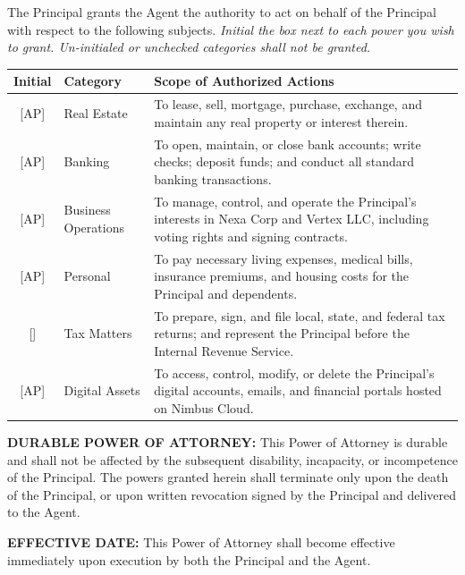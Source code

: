 \documentclass[10pt,letterpaper]{article}
\begin{document}
\begin{tcolorbox}[
    title={2. GRANT OF POWERS \& SCOPE},
    before=\noindent,
    after=\vspace{8pt}
]
\small
The Principal grants the Agent the authority to act on behalf of the Principal with respect to the following subjects. \textit{Initial the box next to each power you wish to grant. Un-initialed or unchecked categories shall not be granted.}
\vspace{6pt}

\begin{tabularx}{\textwidth}{@{} c l X @{}}
    \toprule
    \textbf{Initial} & \textbf{Category} & \textbf{Scope of Authorized Actions} \\
    \midrule{}
    [\quad AP\quad] & Real Estate & To lease, sell, mortgage, purchase, exchange, and maintain any real property or interest therein. \\
    \midrule{}
    [\quad AP\quad] & Banking & To open, maintain, or close bank accounts; write checks; deposit funds; and conduct all standard banking transactions. \\
    \midrule{}
    [\quad AP\quad] & Business Operations & To manage, control, and operate the Principal's interests in Nexa Corp and Vertex LLC, including voting rights and signing contracts. \\
    \midrule{}
    [\quad AP\quad] & Personal & To pay necessary living expenses, medical bills, insurance premiums, and housing costs for the Principal and dependents. \\
    \midrule{}
    [\quad \phantom{AP}\quad] & Tax Matters & To prepare, sign, and file local, state, and federal tax returns; and represent the Principal before the Internal Revenue Service. \\
    \midrule{}
    [\quad AP\quad] & Digital Assets & To access, control, modify, or delete the Principal's digital accounts, emails, and financial portals hosted on Nimbus Cloud. \\
    \bottomrule
\end{tabularx}
\end{tcolorbox}

\newpage

\begin{tcolorbox}[
    title={3. DURABILITY \& EFFECTIVE DATE},
    before=\noindent,
    after=\vspace{8pt}
]
\textbf{DURABLE POWER OF ATTORNEY:} This Power of Attorney is durable and shall not be affected by the subsequent disability, incapacity, or incompetence of the Principal. The powers granted herein shall terminate only upon the death of the Principal, or upon written revocation signed by the Principal and delivered to the Agent.
\vspace{6pt}

\textbf{EFFECTIVE DATE:} This Power of Attorney shall become effective immediately upon execution by both the Principal and the Agent.
\end{tcolorbox}
\end{document}
